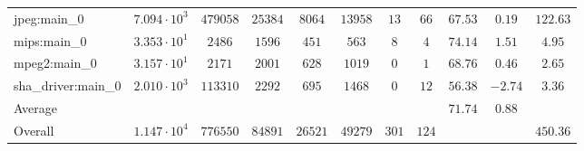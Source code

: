 \begin{tabular}{|l|c|c|c|c|c|c|c|c|c|c|}
jpeg:main\_0            & $ 7.094 \cdot 10^{3} $ & $ 479058 $ & $ 25384 $ & $ 8064  $ & $ 13958 $ & $ 13  $ & $ 66  $ & $ 67.53       $ & $ 0.19    $ & $ 122.63  $ \\
mips:main\_0            & $ 3.353 \cdot 10^{1} $ & $ 2486   $ & $ 1596  $ & $ 451   $ & $ 563   $ & $ 8   $ & $ 4   $ & $ 74.14       $ & $ 1.51    $ & $ 4.95    $ \\
mpeg2:main\_0           & $ 3.157 \cdot 10^{1} $ & $ 2171   $ & $ 2001  $ & $ 628   $ & $ 1019  $ & $ 0   $ & $ 1   $ & $ 68.76       $ & $ 0.46    $ & $ 2.65    $ \\
sha\_driver:main\_0     & $ 2.010 \cdot 10^{3} $ & $ 113310 $ & $ 2292  $ & $ 695   $ & $ 1468  $ & $ 0   $ & $ 12  $ & $ 56.38       $ & $ -2.74   $ & $ 3.36    $ \\
\hline
Average                 & $                    $ & $        $ & $       $ & $       $ & $       $ & $     $ & $     $ & $ 71.74       $ & $ 0.88    $ & $         $ \\
\hline
Overall                 & $ 1.147 \cdot 10^{4} $ & $ 776550 $ & $ 84891 $ & $ 26521 $ & $ 49279 $ & $ 301 $ & $ 124 $ & $             $ & $         $ & $ 450.36  $ \\
\hline
\end{tabular}

